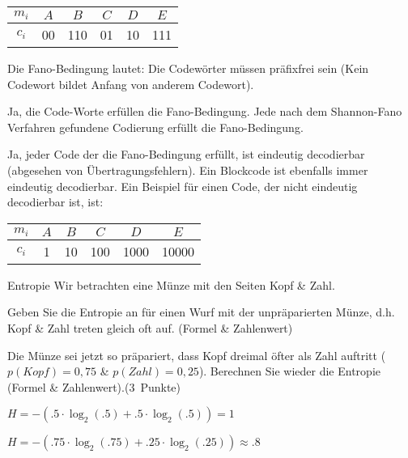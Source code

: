 \documentclass{exercisesheet}
\begin{document}
\begin{solutions}
  \item
  \begin{tabular}{c|ccccc}
    $m_i$ & $A$ & $B$ & $C$ & $D$ & $E$ \\
    \hline
    $c_i$ & 00  & 110 & 01  & 10  & 111 \\
  \end{tabular}
  \item Die Fano-Bedingung lautet: Die Codewörter müssen präfixfrei sein (Kein Codewort bildet Anfang von anderem Codewort).
  \item Ja, die Code-Worte erfüllen die Fano-Bedingung. Jede nach dem Shannon-Fano Verfahren gefundene Codierung erfüllt die Fano-Bedingung.
  \item Ja, jeder Code der die Fano-Bedingung erfüllt, ist eindeutig decodierbar (abgesehen von Übertragungsfehlern). Ein Blockcode ist ebenfalls immer eindeutig decodierbar. Ein Beispiel für einen Code, der nicht eindeutig decodierbar ist, ist:\par
  \begin{tabular}{c|ccccc}
    $m_i$ & $A$ & $B$ & $C$ & $D$  & $E$   \\
    \hline
    $c_i$ & 1   & 10  & 100 & 1000 & 10000 \\
  \end{tabular}
\end{solutions}

\begin{eexercises}{Entropie}{
    Wir betrachten eine Münze mit den Seiten Kopf \& Zahl.
  }
  \item Geben Sie die Entropie an für einen Wurf mit der unpräparierten Münze, d.h. Kopf \& Zahl treten gleich oft auf. (Formel \& Zahlenwert)\points[3]
  \item Die Münze sei jetzt so präpariert, dass Kopf dreimal öfter als Zahl auftritt ($p(Kopf) = 0,75$ \& $p(Zahl) = 0,25$). Berechnen Sie wieder die Entropie (Formel \& Zahlenwert).(3~Punkte)
\end{eexercises}

\begin{solutions}
  \item $H = -(.5\cdot\log_2(.5) + .5\cdot\log_2(.5)) = 1$
  \item $H = -(.75\cdot\log_2(.75) + .25\cdot\log_2(.25)) \approx .8$
\end{solutions}
\end{document}
